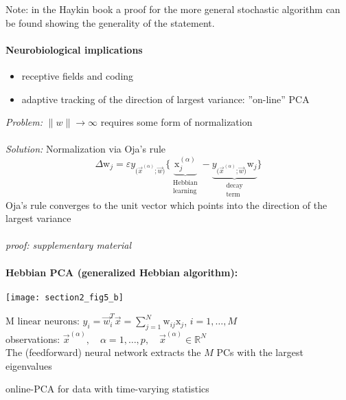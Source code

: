 Note: in the Haykin book a proof for the more general stochastic algorithm can be 
found showing the generality of the statement.

\paragraph{Neurobiological implications} 
\begin{itemize}
\item receptive fields and coding
\item adaptive tracking of the direction of largest variance: ''on-line'' PCA
\end{itemize}
%
\emph{Problem:} $\|w\| \to \infty$ \ra requires some form of normalization
\\\\
\emph{Solution:} Normalization via Oja's rule
\begin{equation}
	\Delta \mathrm{w}_j = \varepsilon y_{ \big( \vec{x}^{(\alpha)}; \vec{w}
		\big) } \bigg\{ 
			\underbrace{ \mathrm{x}_j^{(\alpha)} }_{
				\substack{	\text{Hebbian} \\
						\text{learning} }}
			- \underbrace{ y_{ \big( \vec{x}^{(\alpha)}; \vec{w}
				\big) } \mathrm{w}_j }_{ 
				\substack{	\text{decay} \\
						\text{term} }}
			\bigg\}
\end{equation}
Oja's rule converges to the unit vector which points into the direction of the
largest variance 
\\\\
{\it proof: supplementary material}

\paragraph{Hebbian PCA (generalized Hebbian algorithm):}
\begin{center}
		\texttt{[image: section2\_fig5\_b]}
\end{center}
	$\text{M linear neurons: } y_i = \vec{w}_i^T \vec{x} = \sum_{j=1}^{N} \mathrm{w}_{ij} \mathrm{x}_j $, $i=1, \dots, M$\\
	observations: $\vec{x}^{(\alpha)},\quad \alpha = 1, \ldots, p,\quad \vec{x}^{(\alpha)} \in \mathbb{R}^N$ \\ 
	\vspace{5mm}
	The (feedforward) neural network extracts the $M$ PCs with the largest eigenvalues\\
	\begin{itemize}
		\itl online-PCA for data with time-varying statistics
	\end{itemize} 

